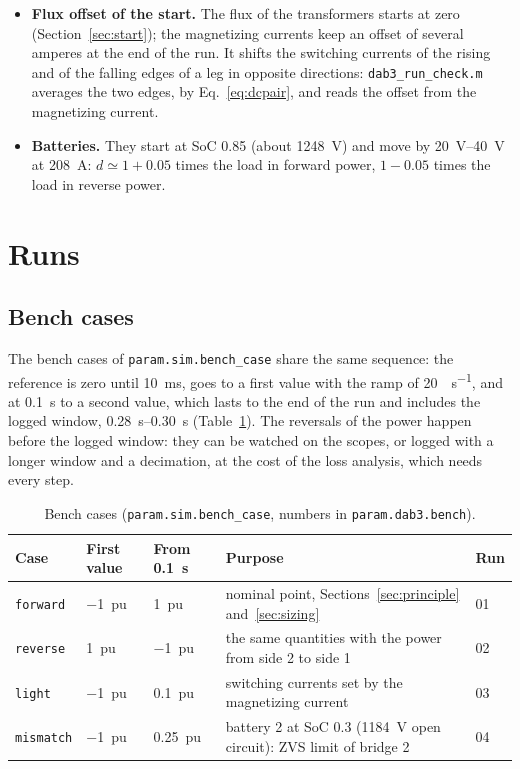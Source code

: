 \documentclass[12pt,a4paper]{scrartcl}
\newcommand{\code}[1]{\texttt{#1}}
\begin{document}
\begin{onehalfspace}
\begin{itemize}[nosep]
	\item \textbf{Flux offset of the start.} The flux of the transformers starts at zero (Section~\ref{sec:start}); the magnetizing currents keep an offset of several amperes at the end of the run. It shifts the switching currents of the rising and of the falling edges of a leg in opposite directions: \code{dab3\_run\_check.m} averages the two edges, by Eq.~\eqref{eq:dcpair}, and reads the offset from the magnetizing current.
	\item \textbf{Batteries.} They start at SoC 0.85 (about \SI{1248}{\volt}) and move by \SIrange{20}{40}{\volt} at \SI{208}{\ampere}: $d \simeq 1 + 0.05$ times the load in forward power, $1 - 0.05$ times the load in reverse power.
\end{itemize}

\section{Runs}
\label{sec:runs}

\subsection{Bench cases}
\label{sec:cases}

The bench cases of \code{param.sim.bench\_case} share the same sequence: the reference is zero until \SI{10}{\milli\second}, goes to a first value with the ramp of \SI{20}{\pu\per\second}, and at \SI{0.1}{\second} to a second value, which lasts to the end of the run and includes the logged window, \SIrange{0.28}{0.30}{\second} (Table~\ref{tab:cases}). The reversals of the power happen before the logged window: they can be watched on the scopes, or logged with a longer window and a decimation, at the cost of the loss analysis, which needs every step.

\begin{table}[H]
	\centering
	\captionsetup{width=0.9\textwidth, font=small}
	\caption{Bench cases (\code{param.sim.bench\_case}, numbers in \code{param.dab3.bench}).}
	\label{tab:cases}
	\small
	\begin{tabularx}{0.97\textwidth}{@{} l l l X l @{}}
		\toprule
		\textbf{Case} & \textbf{First value} & \textbf{From \SI{0.1}{\second}} & \textbf{Purpose} & \textbf{Run} \\
		\midrule
		\code{forward} & \SI{-1}{pu} & \SI{+1}{pu} & nominal point, Sections~\ref{sec:principle} and~\ref{sec:sizing} & 01 \\
		\code{reverse} & \SI{+1}{pu} & \SI{-1}{pu} & the same quantities with the power from side 2 to side 1 & 02 \\
		\code{light} & \SI{-1}{pu} & \SI{+0.1}{pu} & switching currents set by the magnetizing current & 03 \\
		\code{mismatch} & \SI{-1}{pu} & \SI{+0.25}{pu} & battery 2 at SoC 0.3 (\SI{1184}{\volt} open circuit): ZVS limit of bridge 2 & 04 \\
		\bottomrule
	\end{tabularx}
\end{table}


\end{onehalfspace}
\end{document}
